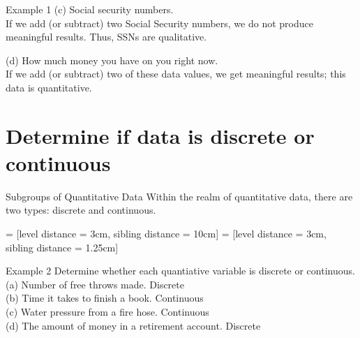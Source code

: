 \documentclass[t]{beamer}
\begin{document}
\begin{frame}{Example 1}
(c) \quad Social security numbers.	\newline\\
If we add (or subtract) two Social Security numbers, we do not produce meaningful results. Thus, SSNs are qualitative.	\newline\\	\pause

(d) \quad How much money you have on you right now. \newline\\	\pause
If we add (or subtract) two of these data values, we get meaningful results; this data is quantitative.
\end{frame}

\section{Determine if data is discrete or continuous}

\begin{frame}{Subgroups of Quantitative Data}
Within the realm of quantitative data, there are two types: discrete and continuous.	\newline\\	\pause
\begin{center}
 = [level distance = 3cm, sibling distance = 10cm]
 = [level distance = 3cm, sibling distance = 1.25cm]
\end{center}
\end{frame}

\begin{frame}{Example 2}
Determine whether each quantiative variable is discrete or continuous.	\newline\\	
(a)	\quad Number of free throws made.	\quad	\pause
Discrete \newline\\ \pause
(b) \quad Time it takes to finish a book. \quad \pause
Continuous \newline\\ \pause
(c) \quad Water pressure from a fire hose. \quad \pause
Continuous \newline\\ \pause
(d) \quad The amount of money in a retirement account. \quad \pause Discrete
\end{frame}
\end{document}
